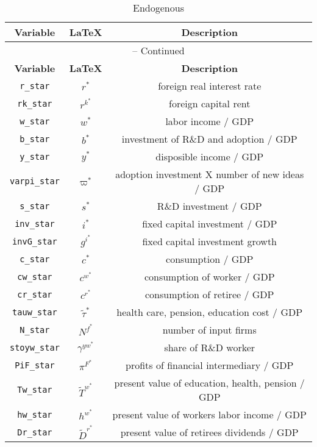 \begin{center}
\begin{longtable}{ccc}
\caption{Endogenous}\\%
\hline%
\multicolumn{1}{c}{\textbf{Variable}} &
\multicolumn{1}{c}{\textbf{\LaTeX}} &
\multicolumn{1}{c}{\textbf{Description}}\\%
\hline\hline%
\endfirsthead
\multicolumn{3}{c}{{\tablename} \thetable{} -- Continued}\\%
\hline%
\multicolumn{1}{c}{\textbf{Variable}} &
\multicolumn{1}{c}{\textbf{\LaTeX}} &
\multicolumn{1}{c}{\textbf{Description}}\\%
\hline\hline%
\endhead
\texttt{r\_star} & ${r^*}$ & foreign real interest rate\\
\texttt{rk\_star} & ${r^k^*}$ & foreign capital rent\\
\texttt{w\_star} & ${w^*}$ & labor income / GDP\\
\texttt{b\_star} & ${b^*}$ & investment of R\&D and adoption / GDP\\
\texttt{y\_star} & ${y^*}$ & disposible income / GDP\\
\texttt{varpi\_star} & ${\varpi^*}$ & adoption investment X number of new ideas / GDP\\
\texttt{s\_star} & ${s^*}$ & R\&D investment / GDP\\
\texttt{inv\_star} & ${i^*}$ & fixed capital investment / GDP\\
\texttt{invG\_star} & ${g^i^*}$ & fixed capital investment growth\\
\texttt{c\_star} & ${c^*}$ & consumption / GDP\\
\texttt{cw\_star} & ${c^w^*}$ & consumption of worker / GDP\\
\texttt{cr\_star} & ${c^r^*}$ & consumption of retiree / GDP\\
\texttt{tauw\_star} & $\tilde{\tau}^*$ & health care, pension, education cost / GDP\\
\texttt{N\_star} & ${N^f^*}$ & number of input firms\\
\texttt{stoyw\_star} & ${\gamma^{yw}^*}$ & share of R\&D worker\\
\texttt{PiF\_star} & ${\pi^F^*}$ & profits of financial intermediary / GDP\\
\texttt{Tw\_star} & $\tilde{T}^w^*$ & present value of education, health, pension / GDP\\
\texttt{hw\_star} & ${h^w^*}$ & present value of workers labor income / GDP\\
\texttt{Dr\_star} & $\tilde{D}^r^*$ & present value of retirees dividends / GDP\\

\end{longtable}
\end{center}
